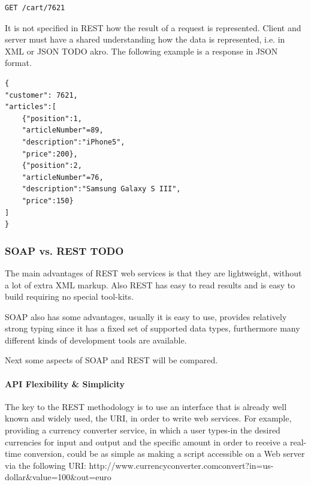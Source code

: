 \begin{lstlisting}
GET /cart/7621
\end{lstlisting}

It is not specified in REST how the result of a request is represented. Client and server must have a shared understanding how the data is represented, i.e. in XML or JSON TODO akro. The following example is a response in JSON format.

\begin{lstlisting}
{
"customer": 7621,
"articles":[
	{"position":1,
	"articleNumber"=89,
	"description":"iPhone5",
	"price":200},
	{"position":2,
	"articleNumber"=76,
	"description":"Samsung Galaxy S III",
	"price":150}
]
}
\end{lstlisting}

\subsubsection{SOAP vs. REST TODO\label{sec:back_soap_vs_rest}}

The main advantages of REST web services is that they are lightweight, without a lot of extra XML markup. Also REST has easy to read results and is easy to build requiring no special tool-kits.

SOAP also has some advantages, usually it is easy to use, provides relatively strong typing since it has a fixed set of supported data types, furthermore many different kinds of development tools are available.

Next some aspects of SOAP and REST will be compared.

\paragraph{API Flexibility \& Simplicity}

The key to the REST methodology is to use an interface that is already well known and widely used, the URI, in order to write web services. For example, providing a currency converter service, in which a user types-in the desired currencies for input and output and the specific amount in order to receive a real-time conversion, could be as simple as making a script accessible on a Web server via the following URI: http://www.currencyconverter.com\/convert?in=us-dollar\&value=100\&out=euro

